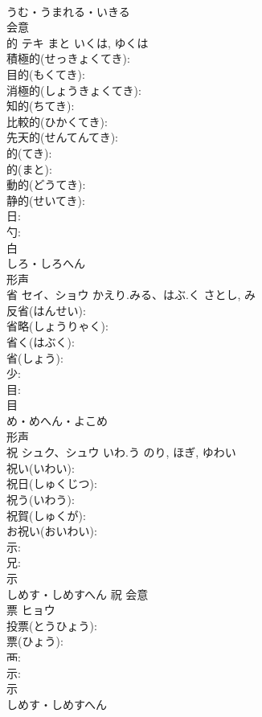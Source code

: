 \documentclass[8pt]{extreport}
\begin{document}
\begin{CJK}{UTF8}{min}
\\	うむ・うまれる・いきる	
\\	会意 
\\	的	テキ	まと	いくは, ゆくは	
\\	積極的(せっきょくてき): 
\\	目的(もくてき): 
\\	消極的(しょうきょくてき): 
\\	知的(ちてき): 
\\	比較的(ひかくてき): 
\\	先天的(せんてんてき): 
\\	的(てき): 
\\	的(まと): 
\\	動的(どうてき): 
\\	静的(せいてき): 
\\	日: 
\\	勺: 
\\	白	
\\	しろ・しろへん	
\\	形声 
\\	省	セイ、ショウ	かえり.みる、はぶ.く	さとし, み	
\\	反省(はんせい): 
\\	省略(しょうりゃく): 
\\	省く(はぶく): 
\\	省(しょう): 
\\	少: 
\\	目: 
\\	目	
\\	め・めへん・よこめ	
\\	形声 
\\	祝	シュク、シュウ	いわ.う	のり, ほぎ, ゆわい	
\\	祝い(いわい): 
\\	祝日(しゅくじつ): 
\\	祝う(いわう): 
\\	祝賀(しゅくが): 
\\	お祝い(おいわい): 
\\	示: 
\\	兄: 
\\	示	
\\	しめす・しめすへん	祝	会意 
\\	票	ヒョウ			
\\	投票(とうひょう): 
\\	票(ひょう): 
\\	襾: 
\\	示: 
\\	示	
\\	しめす・しめすへん	

\end{CJK}
\end{document}
